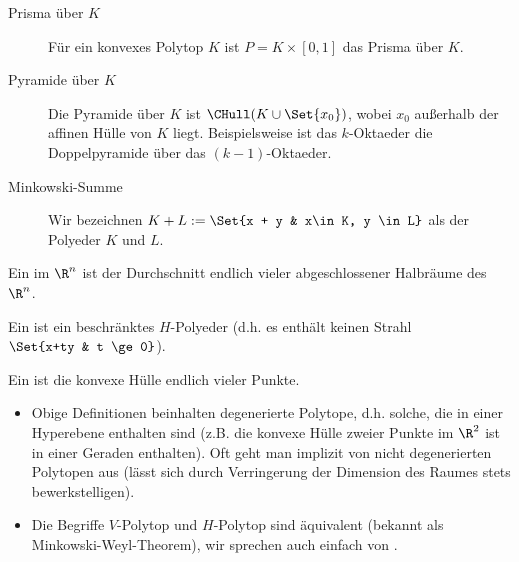\begin{ex}
\begin{description}
        \item[Prisma über $K$]
            Für ein konvexes Polytop $K$ ist $P = K \times [0,1]$ das Prisma über $K$.

        \item[Pyramide über $K$]
            Die Pyramide über $K$ ist $\CHull(K \cup \Set{x_0})$, wobei $x_0$ außerhalb der affinen Hülle von $K$ liegt.
            Beispielsweise ist das $k$-Oktaeder die Doppelpyramide über das $(k-1)$-Oktaeder.

        \item[Minkowski-Summe]
            Wir bezeichnen
            \begin{math}
                K + L := \Set{x + y & x\in K, y \in L}
            \end{math}
            als  der Polyeder $K$ und $L$.

    \end{description}
\end{ex}


\begin{df}
    Ein  im $\R^n$ ist der Durchschnitt endlich vieler abgeschlossener Halbräume des $\R^n$.

    Ein  ist ein beschränktes $H$-Polyeder (d.h. es enthält keinen Strahl $\Set{x+ty & t \ge 0}$).
\end{df}

\begin{df}[$V$-Polytop]
    Ein  ist die konvexe Hülle endlich vieler Punkte.
\end{df}

\begin{note}
    \begin{itemize}
        \item
            Obige Definitionen beinhalten degenerierte Polytope, d.h. solche, die in einer Hyperebene enthalten sind (z.B. die konvexe Hülle zweier Punkte im $\R^2$ ist in einer Geraden enthalten).
            Oft geht man implizit von nicht degenerierten Polytopen aus (lässt sich durch Verringerung der Dimension des Raumes stets bewerkstelligen).
        \item
            Die Begriffe $V$-Polytop und $H$-Polytop sind äquivalent (bekannt als Minkowski-Weyl-Theorem), wir sprechen auch einfach von .
    \end{itemize}
\end{note}

